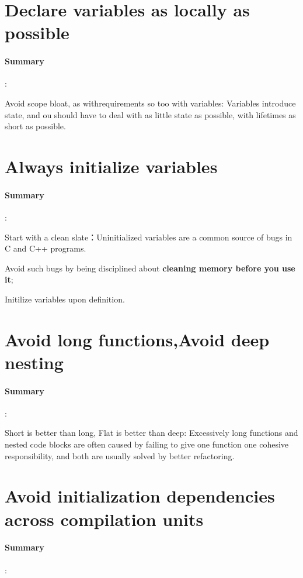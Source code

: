 \documentclass[UTF8,a4paper,12pt]{ctexbook}
\begin{document}
	\section{Declare variables as locally as possible}
		\paragraph{Summary}:
		
			Avoid scope bloat, as withrequirements so too with variables: Variables introduce state, and ou should have to deal with as little state as possible, with lifetimes as short as possible.
		
	\section{Always initialize variables}
		\paragraph{Summary}:
		
			Start with a clean slate：Uninitialized variables are a common source of bugs in C and C++ programs.
			
			Avoid such bugs by being disciplined about \textbf{cleaning memory before you use it};
			
			Initilize variables upon definition.
			
	\section{Avoid long functions,Avoid deep nesting}
		\paragraph{Summary}:
		
			Short is better than long, Flat is better than deep: Excessively long functions and nested code blocks are often caused by failing to give one function one cohesive responsibility, and both are usually solved by better refactoring.
		
	\section{Avoid initialization dependencies across compilation units}
		\paragraph{Summary}:
			
\end{document}
